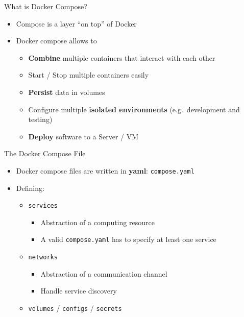 
\begin{frame}{What is Docker Compose?}
  \begin{itemize}
    \item Compose is a layer ``on top'' of Docker
    \item Docker compose allows to
      \begin{itemize}
        \item \textbf{Combine} multiple containers that interact with each other
        \item Start / Stop multiple containers easily
        \item \textbf{Persist} data in volumes
        \item Configure multiple \textbf{isolated environments} (e.g.\ development and testing)
        \item \textbf{Deploy} software to a Server / VM
      \end{itemize}
  \end{itemize}
\end{frame}

\begin{frame}{The Docker Compose File}
  \begin{itemize}
    \item Docker compose files are written in \textbf{yaml}: \texttt{compose.yaml}
    \item Defining:
      \begin{itemize}
        \item \texttt{services}
          \begin{itemize}
            \item Abstraction of a computing resource
            \item A valid \texttt{compose.yaml} has to specify at least one service
          \end{itemize}
        \item \texttt{networks}
          \begin{itemize}
            \item Abstraction of a communication channel
            \item Handle service discovery
          \end{itemize}
        \item \texttt{volumes} / \texttt{configs} / \texttt{secrets}
      \end{itemize}
  \end{itemize}
\end{frame}

